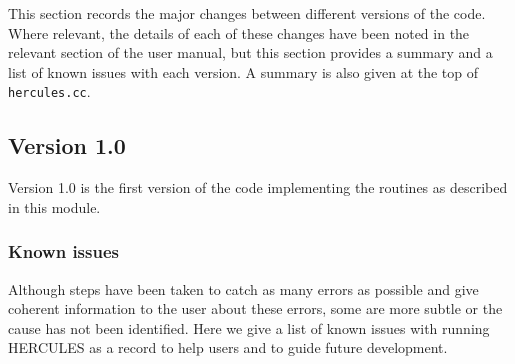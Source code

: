 \documentclass[11pt, oneside]{article}   	%
\begin{document}
This section records the major changes between different versions of the code. 
Where relevant, the details of each of these changes have been noted in the relevant section of the user manual, but this section provides a summary and a list of known issues with each version.
A summary is also given at the top of \texttt{hercules.cc}.

\subsection{Version 1.0}

Version 1.0 is the first version of the code implementing the routines as described in this module. 

\subsubsection{Known issues}

Although steps have been taken to catch as many errors as possible and give coherent information to the user about these errors, some are more subtle or the cause has not been identified.
Here we give a list of known issues with running HERCULES as a record to help users and to guide future development.
\end{document}
